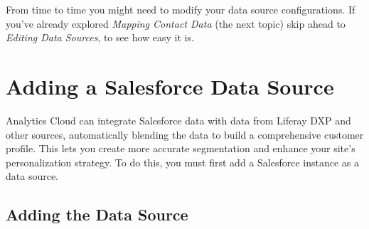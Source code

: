 From time to time you might need to modify your data source
configurations. If you've already explored \emph{Mapping Contact Data}
(the next topic) skip ahead to \emph{Editing Data Sources}, to see how
easy it is.

\section{Adding a Salesforce Data
Source}\label{adding-a-salesforce-data-source}

Analytics Cloud can integrate Salesforce data with data from Liferay DXP
and other sources, automatically blending the data to build a
comprehensive customer profile. This lets you create more accurate
segmentation and enhance your site's personalization strategy. To do
this, you must first add a Salesforce instance as a data source.

\subsection{Adding the Data Source}\label{adding-the-data-source}

